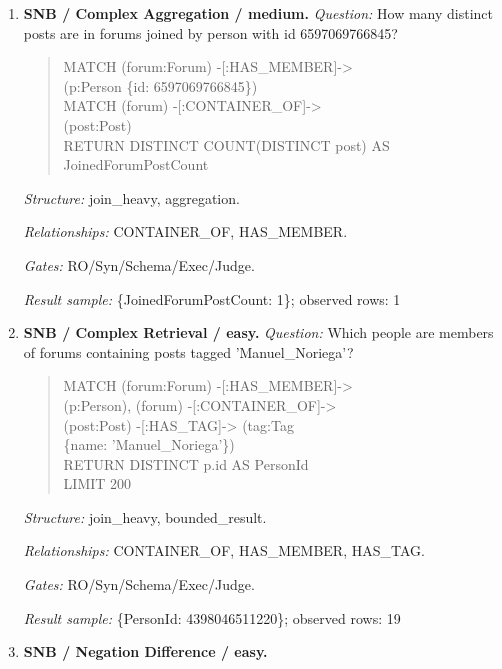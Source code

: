 \begin{enumerate}
\begin{quote}
\end{quote}
\textit{Structure:} single\_hop, aggregation, optional.\par
\textit{Relationships:} LIKES.\par
\textit{Gates:} RO/Syn/Schema/Exec/Judge.\par
\textit{Result sample:} \{LikesAnyPost: True\}; observed rows: 1
\item \textbf{SNB / Complex Aggregation / medium.}
\textit{Question:} How many distinct posts are in forums joined by person with id 6597069766845?
\begin{quote}\scriptsize\ttfamily\raggedright\sloppy
MATCH (forum:Forum) -[:HAS\_MEMBER]-\textgreater{}\\
(p:Person \{id: 6597069766845\})\\
MATCH (forum) -[:CONTAINER\_OF]-\textgreater{}\\
(post:Post)\\
RETURN DISTINCT COUNT(DISTINCT post) AS\\
JoinedForumPostCount
\end{quote}
\textit{Structure:} join\_heavy, aggregation.\par
\textit{Relationships:} CONTAINER\_OF, HAS\_MEMBER.\par
\textit{Gates:} RO/Syn/Schema/Exec/Judge.\par
\textit{Result sample:} \{JoinedForumPostCount: 1\}; observed rows: 1
\item \textbf{SNB / Complex Retrieval / easy.}
\textit{Question:} Which people are members of forums containing posts tagged 'Manuel\_Noriega'?
\begin{quote}\scriptsize\ttfamily\raggedright\sloppy
MATCH (forum:Forum) -[:HAS\_MEMBER]-\textgreater{}\\
(p:Person), (forum) -[:CONTAINER\_OF]-\textgreater{}\\
(post:Post) -[:HAS\_TAG]-\textgreater{} (tag:Tag\\
\{name: 'Manuel\_Noriega'\})\\
RETURN DISTINCT p.id AS PersonId\\
LIMIT 200
\end{quote}
\textit{Structure:} join\_heavy, bounded\_result.\par
\textit{Relationships:} CONTAINER\_OF, HAS\_MEMBER, HAS\_TAG.\par
\textit{Gates:} RO/Syn/Schema/Exec/Judge.\par
\textit{Result sample:} \{PersonId: 4398046511220\}; observed rows: 19
\item \textbf{SNB / Negation Difference / easy.}

\end{enumerate}
